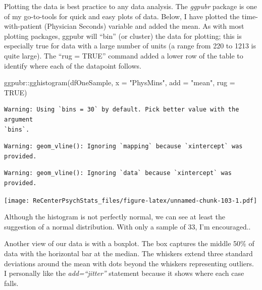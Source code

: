 \documentclass[
  11pt,
]{book}
\newenvironment{Shaded}{\begin{snugshade}}{\end{snugshade}}
\newcommand{\AttributeTok}[1]{\textcolor[rgb]{0.77,0.63,0.00}{#1}}
\newcommand{\ConstantTok}[1]{\textcolor[rgb]{0.00,0.00,0.00}{#1}}
\newcommand{\FunctionTok}[1]{\textcolor[rgb]{0.00,0.00,0.00}{#1}}
\newcommand{\NormalTok}[1]{#1}
\newcommand{\SpecialCharTok}[1]{\textcolor[rgb]{0.00,0.00,0.00}{#1}}
\newcommand{\StringTok}[1]{\textcolor[rgb]{0.31,0.60,0.02}{#1}}
\begin{document}
Plotting the data is best practice to any data analysis. The \emph{ggpubr} package is one of my go-to-tools for quick and easy plots of data. Below, I have plotted the time-with-patient (Physician Seconds) variable and added the mean. As with most plotting packages, ggpubr will ``bin'' (or cluster) the data for plotting; this is especially true for data with a large number of units (a range from 220 to 1213 is quite large). The ``rug = TRUE'' command added a lower row of the table to identify where each of the datapoint follows.

\begin{Shaded}
\begin{Highlighting}[]
\NormalTok{ggpubr}\SpecialCharTok{::}\FunctionTok{gghistogram}\NormalTok{(dfOneSample, }\AttributeTok{x =} \StringTok{"PhysMins"}\NormalTok{, }\AttributeTok{add =} \StringTok{"mean"}\NormalTok{, }\AttributeTok{rug =} \ConstantTok{TRUE}\NormalTok{)}
\end{Highlighting}
\end{Shaded}

\begin{verbatim}
Warning: Using `bins = 30` by default. Pick better value with the argument
`bins`.
\end{verbatim}

\begin{verbatim}
Warning: geom_vline(): Ignoring `mapping` because `xintercept` was provided.
\end{verbatim}

\begin{verbatim}
Warning: geom_vline(): Ignoring `data` because `xintercept` was provided.
\end{verbatim}

\texttt{[image: ReCenterPsychStats\_files/figure-latex/unnamed-chunk-103-1.pdf]}

Although the histogram is not perfectly normal, we can see at least the suggestion of a normal distribution. With only a sample of 33, I'm encouraged..

Another view of our data is with a boxplot. The box captures the middle 50\% of data with the horizontal bar at the median. The whiskers extend three standard deviations around the mean with dots beyond the whiskers representing outliers. I personally like the \emph{add=``jitter''} statement because it shows where each case falls.

\begin{Shaded}
\end{Shaded}
\end{document}
